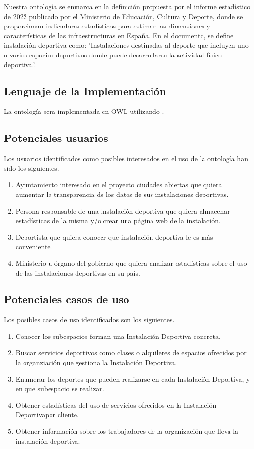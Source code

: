 \documentclass[a4paper,12pt]{article}
\begin{document}
	Nuestra ontología se enmarca en la definición propuesta por el informe estadístico de 2022 publicado por el Ministerio de Educación, Cultura y Deporte, donde se proporcionan indicadores estadísticos para estimar las dimensiones y características de las infraestructuras en España. En el documento, se define instalación deportiva como: 'Instalaciones destinadas al
deporte que incluyen uno o varios espacios
deportivos donde puede desarrollarse la actividad
físico-deportiva.'.
	
	\subsection{Lenguaje de la Implementación}
	La ontología sera implementada en OWL utilizando .
	
	\subsection{Potenciales usuarios}
	Los usuarios identificados como posibles interesados en el uso de la ontología han sido los siguientes.
	\begin{enumerate}
		\item Ayuntamiento interesado en el proyecto ciudades abiertas que quiera aumentar la transparencia de los datos de sus instalaciones deportivas.
		\item Persona responsable de una instalación deportiva que quiera almacenar estadísticas de la misma y/o crear una página web de la instalación.
		\item Deportista que quiera conocer que instalación deportiva le es más conveniente.
		\item Ministerio u órgano del gobierno que quiera analizar estadísticas sobre el uso de las instalaciones deportivas en su país.
	\end{enumerate}

	\subsection{Potenciales casos de uso}
	Los posibles casos de uso identificados son los siguientes.
	\begin{enumerate}
		\item Conocer los subespacios forman una Instalación Deportiva concreta.
		\item Buscar servicios deportivos como clases o alquileres de espacios ofrecidos por la organziación que gestiona la Instalación Deportiva.
		\item Enumerar los deportes que pueden realizarse en cada Instalación Deportiva, y en que subespacio se realizan.
		\item Obtener estadísticas del uso de servicios ofrecidos en la Instalación Deportivapor cliente.
		\item Obtener información sobre los trabajadores de la organización que lleva la instalación deportiva.
	\end{enumerate}
	
\end{document}
